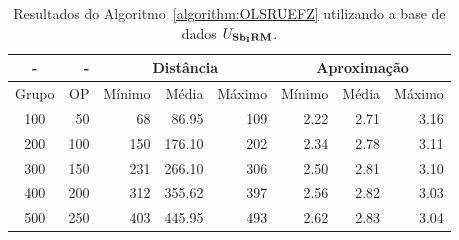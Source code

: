 \begin{table}[!htb]
  \caption{Resultados do Algoritmo~\ref{algorithm:OLSRUEFZ} utilizando a base de dados $U_{\textbf{Sb\textsubscript{I}RM}}{}$.}
  \label{table:RQMOVGKQ}
  \centering
  \begin{tabular}{|c|r|r|r|r|r|r|r|}
    \hline
      -      &  -   & \multicolumn{3}{c|}{Distância}             & \multicolumn{3}{c|}{Aproximação}           \\ \hline
    Grupo    & OP   & Mínimo       & Média        & Máximo       & Mínimo       & Média        & Máximo       \\ \hline  
    100      & 50   & 68           &  86.95       & 109          & 2.22         &         2.71 & 3.16         \\ \hline
    200      & 100  & 150          & 176.10       & 202          & 2.34         &         2.78 & 3.11         \\ \hline
    300      & 150  & 231          & 266.10       & 306          & 2.50         &         2.81 & 3.10         \\ \hline
    400      & 200  & 312          & 355.62       & 397          & 2.56         &         2.82 & 3.03         \\ \hline
    500      & 250  & 403          & 445.95       & 493          & 2.62         &         2.83 & 3.04         \\ \hline    
  \end{tabular}
\end{table}